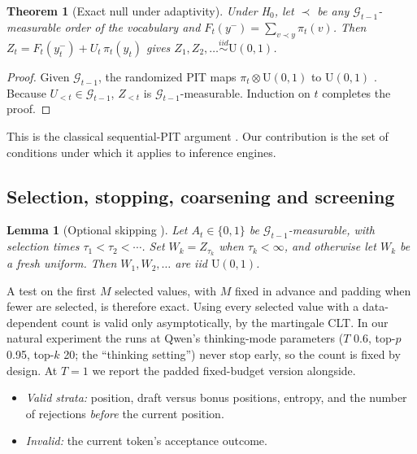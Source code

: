 \documentclass[10pt]{article}
\newtheorem{theorem}{Theorem}
\newtheorem{lemma}{Lemma}
\theoremstyle{remark}
\begin{document}
\begin{theorem}[Exact null under adaptivity]\label{thm:pit}
Under H$_0$, let $\prec$ be any $\mathcal G_{t-1}$-measurable order of the vocabulary and $F_t(y^-)=\sum_{v\prec y}\pi_t(v)$. Then $Z_t=F_t(y_t^-)+U_t\,\pi_t(y_t)$ gives $Z_1,Z_2,\dots\overset{iid}{\sim}\mathrm U(0,1)$.
\end{theorem}
\begin{proof}
Given $\mathcal G_{t-1}$, the randomized PIT maps $\pi_t\otimes\mathrm U(0,1)$ to $\mathrm U(0,1)$ \cite{brockwell2007,czado2009}. Because $U_{<t}\in\mathcal G_{t-1}$, $Z_{<t}$ is $\mathcal G_{t-1}$-measurable. Induction on $t$ completes the proof.
\end{proof}
\noindent This is the classical sequential-PIT argument \cite{rosenblatt1952,dawid1984,smdawid1993}. Our contribution is the set of conditions under which it applies to inference engines.

\subsection{Selection, stopping, coarsening and screening}
\begin{lemma}[Optional skipping \cite{doob1936,halmos1939}]\label{lem:skip}
Let $A_t\in\{0,1\}$ be $\mathcal G_{t-1}$-measurable, with selection times $\tau_1<\tau_2<\cdots$. Set $W_k=Z_{\tau_k}$ when $\tau_k<\infty$, and otherwise let $W_k$ be a fresh uniform. Then $W_1,W_2,\dots$ are iid $\mathrm U(0,1)$.
\end{lemma}
\noindent A test on the first $M$ selected values, with $M$ fixed in advance and padding when fewer are selected, is therefore exact. Using every selected value with a data-dependent count is valid only asymptotically, by the martingale CLT. In our natural experiment the runs at Qwen's thinking-mode parameters ($T$ 0.6, top-$p$ 0.95, top-$k$ 20; the ``thinking setting'') never stop early, so the count is fixed by design. At $T{=}1$ we report the padded fixed-budget version alongside.
\begin{itemize}
\item \emph{Valid strata:} position, draft versus bonus positions, entropy, and the number of rejections \emph{before} the current position.
\item \emph{Invalid:} the current token's acceptance outcome.
\end{itemize}
\end{document}
